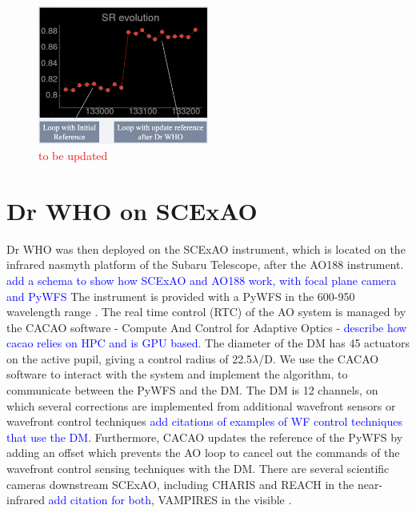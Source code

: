 \documentclass[twocolumn]{aastex62}
\begin{document}
\begin{figure}[ht!]
\begin{center}
\includegraphics[width=0.5\textwidth]{fig/compass_results1.png}
\caption{\textcolor{red}{to be updated} }
\label{fig:comapss_results1}
\end{center}
\end{figure}





\newpage

\section{Dr WHO on SCExAO}

Dr WHO was then deployed on the SCExAO instrument, which is located on the infrared nasmyth platform of the Subaru Telescope, after the AO188 instrument. 
\textcolor{blue}{add a schema to show how SCExAO and AO188 work, with focal plane camera and PyWFS}
The instrument is provided with a PyWFS in the 600-950 wavelength range \citep{Lozi2019PyWFS}. The real time control (RTC) of the AO system is managed by the CACAO software - Compute And Control for Adaptive Optics - \citep{cacao2018} \textcolor{blue}{describe how cacao relies on HPC and is GPU based}. The diameter of the DM has 45 actuators on the active pupil, giving a control radius of 22.5$\lambda$/D. We use the CACAO software to interact with the system and implement the algorithm, to communicate between the PyWFS and the DM. The DM is 12 channels, on which several corrections are implemented from additional wavefront sensors or wavefront control techniques \textcolor{blue}{add citations of examples of WF control techniques that use the DM}. Furthermore, CACAO updates the reference of the PyWFS by adding an offset which prevents the AO loop to cancel out the commands of the wavefront control sensing techniques with the DM. 
There are several scientific cameras downstream SCExAO, including CHARIS and REACH in the near-infrared \textcolor{blue}{add citation for both}, VAMPIRES in the visible \citep{vampires2015}. 
\end{document}
